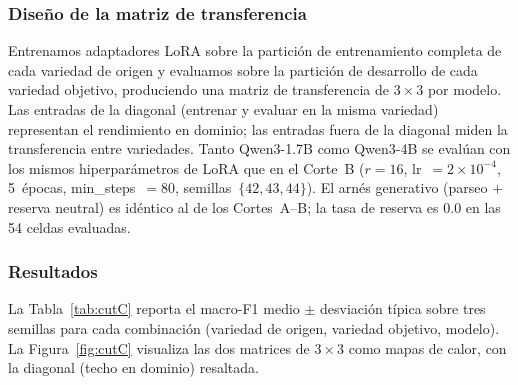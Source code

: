 \documentclass[conference]{IEEEtran}
\begin{document}
\subsubsection*{Diseño de la matriz de transferencia}

Entrenamos adaptadores LoRA sobre la partición de entrenamiento completa de cada
variedad de origen y evaluamos sobre la partición de desarrollo de cada variedad
objetivo, produciendo una matriz de transferencia de $3 \times 3$ por modelo.
Las entradas de la diagonal (entrenar y evaluar en la misma variedad) representan
el rendimiento en dominio; las entradas fuera de la diagonal miden la
transferencia entre variedades.
Tanto Qwen3-1.7B como Qwen3-4B se evalúan con los mismos hiperparámetros de LoRA
que en el Corte~B ($r=16$, lr~$=2\times10^{-4}$, 5~épocas,
min\_steps~$=80$, semillas~$\{42,43,44\}$).
El arnés generativo (parseo + reserva neutral) es idéntico al de los
Cortes~A--B; la tasa de reserva es 0.0 en las 54 celdas evaluadas.

\subsubsection*{Resultados}

La Tabla~\ref{tab:cutC} reporta el macro-F1 medio $\pm$ desviación típica sobre
tres semillas para cada combinación (variedad de origen, variedad objetivo,
modelo).
La Figura~\ref{fig:cutC} visualiza las dos matrices de $3\times3$ como mapas de
calor, con la diagonal (techo en dominio) resaltada.
\end{document}
